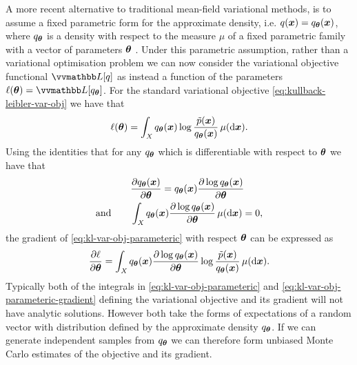 A more recent alternative to traditional mean-field variational methods, is to assume a fixed parametric form for the approximate density, i.e. $q(\boldsymbol{x}) = q_{\boldsymbol{\theta}}(\boldsymbol{x})$, where $q_{\boldsymbol{\theta}}$ is a density with respect to the measure $\mu$ of a fixed parametric family with a vector of parameters $\boldsymbol{\theta}$ \citep{graves2011practical,blei2012variational,salimans2013fixed,ranganath2014black,kucukelbir2016automatic}. Under this parametric assumption, rather than a variational optimisation problem we can now consider the variational objective functional $\varobj[q]$ as instead a function of the parameters $\ell(\vct{\theta}) = \varobj[q_{\vct{\theta}}]$. For the standard variational objective \eqref{eq:kullback-leibler-var-obj} we have that
\begin{equation}\label{eq:kl-var-obj-parameteric}
  \ell(\boldsymbol{\theta}) = 
  \int_{\mathit{X}} q_{\boldsymbol{\theta}}(\boldsymbol{x}) \log\frac{\tilde{p}(\boldsymbol{x})}{q_{\boldsymbol{\theta}}(\boldsymbol{x})} \,\mu(\mathrm{d}\boldsymbol{x}).
\end{equation}
Using the identities that for any $q_{\boldsymbol{\theta}}$ which is differentiable with respect to $\boldsymbol{\theta}$ we have that
\begin{align}\label{eq:log-derivative-identity}
  &\frac{\partial q_{\boldsymbol{\theta}}(\boldsymbol{x})}{\partial \boldsymbol{\theta}} = 
  q_{\boldsymbol{\theta}}(\boldsymbol{x}) \frac{\partial \log q_{\boldsymbol{\theta}}(\boldsymbol{x})}{\partial \boldsymbol{\theta}}\\
  \textrm{and}\qquad &\label{eq:score-function-expectation-identity}
  \int_{\mathit{X}} q_{\boldsymbol{\theta}}(\boldsymbol{x}) \frac{\partial \log q_{\boldsymbol{\theta}}(\boldsymbol{x})}{\partial \boldsymbol{\theta}} \,\mu(\mathrm{d}\boldsymbol{x}) = 0,
\end{align} 
the gradient of \eqref{eq:kl-var-obj-parameteric} with respect $\boldsymbol{\theta}$ can be expressed as
\begin{equation}\label{eq:kl-var-obj-parameteric-gradient}
  \frac{\partial \ell}{\partial \boldsymbol{\theta}} = 
  \int_{\mathit{X}} q_{\boldsymbol{\theta}}(\boldsymbol{x}) \frac{\partial \log q_{\boldsymbol{\theta}}(\boldsymbol{x})}{\partial \boldsymbol{\theta}} \log \frac{\tilde{p}(\boldsymbol{x})}{q_{\boldsymbol{\theta}}(\boldsymbol{x})}  \,\mu(\mathrm{d}\boldsymbol{x}).
\end{equation}
Typically both of the integrals in \eqref{eq:kl-var-obj-parameteric} and \eqref{eq:kl-var-obj-parameteric-gradient} defining the variational objective and its gradient will not have analytic solutions. However both take the forms of expectations of a random vector with distribution defined by the approximate density $q_{\boldsymbol{\theta}}$. If we can generate independent samples from $q_{\boldsymbol{\theta}}$ we can therefore form unbiased Monte Carlo estimates of the objective and its gradient.

